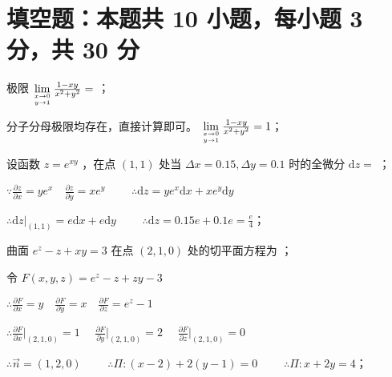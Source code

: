 
\section{填空题：本题共 10 小题，每小题 3 分，共 30 分}

\begin{question}[points = 3]
    极限 $\lim\limits_{x \to 0 \atop y \to 1} \frac{1 - xy}{x^2 + y^2} = $ \fillin[1]；
\end{question}
\begin{solution}
    分子分母极限均存在，直接计算即可。 $\lim\limits_{x \to 0 \atop y \to 1} \frac{1 - xy}{x^2 + y^2} = 1$；
\end{solution}

\begin{question}[points = 3]
    设函数 $z = e^{xy}$ ，在点 $(1, 1)$ 处当 $\Delta x = 0.15, \Delta y = 0.1$ 时的全微分 $\mathrm{d}z = $
    \fillin[$\frac{e}{4}$]；
\end{question}
\begin{solution}
    $\because \frac{\partial z}{\partial x} = ye^x \quad \frac{\partial z}{\partial y} = xe^y \qquad$
    $\therefore \mathrm{d}z = ye^x\mathrm{d}x + xe^y\mathrm{d}y$

    $\therefore \mathrm{d}z|_{(1, 1)} = e\mathrm{d}x + e\mathrm{d}y \qquad$
    $\therefore \mathrm{d}z = 0.15e + 0.1e = \frac{e}{4}$；
\end{solution}

\begin{question}[points = 3]
    曲面 $e^z - z + xy = 3$ 在点 $(2, 1, 0)$ 处的切平面方程为 \fillin[$x + 2y = 4$]；
\end{question}
\begin{solution}
    令 $F(x, y, z) = e^z - z + zy - 3$

    $\therefore \frac{\partial F}{\partial x} = y \quad \frac{\partial F}{\partial y} = x \quad \frac{\partial F}{\partial z} = e^z - 1$

    $\therefore \frac{\partial F}{\partial x}|_{(2, 1, 0)} = 1 \quad$
    $\frac{\partial F}{\partial y}|_{(2, 1, 0)} = 2 \quad$
    $\frac{\partial F}{\partial z}|_{(2, 1, 0)} = 0$

    $\therefore \vec{n} = (1, 2, 0) \qquad$
    $\therefore \Pi: (x - 2) + 2(y - 1) = 0 \qquad$
    $\therefore \Pi: x + 2y = 4$；
\end{solution}

